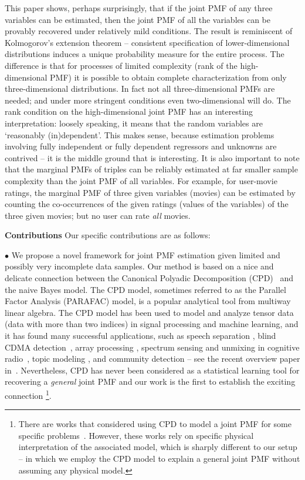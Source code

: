 \documentclass[journal]{IEEEtran}
\begin{document}
This paper shows, perhaps surprisingly, that if the joint PMF of any three variables can be estimated, then the joint PMF of all the variables can be provably recovered under relatively mild conditions. The result is reminiscent of Kolmogorov's extension theorem -- consistent specification of {lower-dimensional} distributions induces a unique probability measure for the entire process. The difference is that for processes of limited complexity (rank of the {high-dimensional} PMF) it is possible to obtain complete characterization from only {three-dimensional} distributions. In fact not all { three-dimensional} PMFs are needed; and under more stringent conditions even {two-dimensional} will do. The rank condition on the { high-dimensional} joint PMF has an interesting interpretation: loosely speaking, it means that  the random variables are `reasonably (in)dependent'. This makes sense, because estimation problems involving fully independent or fully dependent regressors and unknowns are contrived -- it is the middle ground that is interesting. It is also important to note that the marginal PMFs of triples can be reliably estimated at far smaller sample complexity than the joint PMF of all variables. For example, for user-movie ratings, the marginal PMF of three given variables (movies) can be estimated by counting the co-occurrences of the given ratings (values of the variables) of the three given movies; but no user can rate {\em all} movies. 

\smallskip

\noindent
{\bf Contributions} Our specific contributions are as follows:

\noindent
$\bullet$ We propose a novel framework for joint PMF estimation given limited and possibly very incomplete data samples. Our method is based on a nice and delicate connection between the Canonical Polyadic Decomposition (CPD)~\cite{CaCha1970,Har1970} and the naive Bayes model. The CPD model, sometimes referred to as the Parallel Factor Analysis (PARAFAC) model, is a popular analytical tool from multiway linear algebra. The CPD model has been used to model and analyze tensor data (data with more than two indices) in signal processing and machine learning, and it has found many successful applications, such as speech separation \cite{NiSi2010}, blind CDMA detection~\cite{SiGiBro2000}, array processing \cite{SiBroGi2000}, spectrum sensing and unmixing in cognitive radio~\cite{FuSiTra2015}, topic modeling \cite{AnGeHsu2014b}, and community detection \cite{AnGeHsu2014a} -- see the recent overview paper in~\cite{SiDeFu2017}.  Nevertheless, CPD has never been considered as a statistical learning tool for recovering a \emph{general} joint PMF and our work is the first to establish the exciting connection \footnote{There are works that considered using CPD to model a joint PMF for some specific problems~\cite{AnGeHsu2014b}. However, these works rely on specific physical interpretation of the associated model, which is sharply different to our setup -- in which we employ the CPD model to explain a general joint PMF without assuming any physical model.}.
\end{document}
